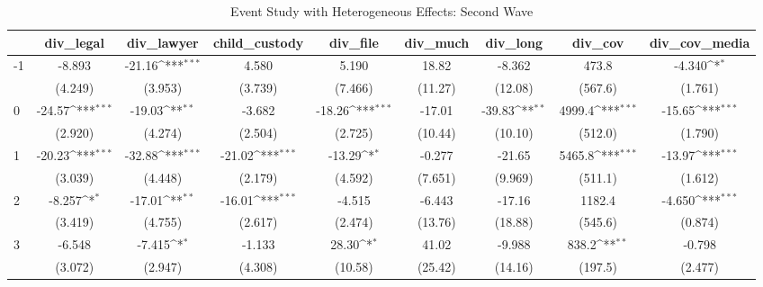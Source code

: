 \documentclass{article}
\begin{document}
{
\def\sym#1{\ifmmode^{#1}\else\(^{#1}\)\fi}
\begin{longtable}{l*{8}{c}}
\caption{Event Study with Heterogeneous Effects: Second Wave}\\
\hline\hline\endfirsthead\hline\endhead\hline\endfoot\endlastfoot
                &\multicolumn{1}{c}{div\_legal}&\multicolumn{1}{c}{div\_lawyer}&\multicolumn{1}{c}{child\_custody}&\multicolumn{1}{c}{div\_file}&\multicolumn{1}{c}{div\_much}&\multicolumn{1}{c}{div\_long}&\multicolumn{1}{c}{div\_cov}&\multicolumn{1}{c}{div\_cov\_media}\\
\hline
-1              &   -8.893         &   -21.16\sym{***}&    4.580         &    5.190         &    18.82         &   -8.362         &    473.8         &   -4.340\sym{*}  \\
                &  (4.249)         &  (3.953)         &  (3.739)         &  (7.466)         &  (11.27)         &  (12.08)         &  (567.6)         &  (1.761)         \\
0               &   -24.57\sym{***}&   -19.03\sym{**} &   -3.682         &   -18.26\sym{***}&   -17.01         &   -39.83\sym{**} &   4999.4\sym{***}&   -15.65\sym{***}\\
                &  (2.920)         &  (4.274)         &  (2.504)         &  (2.725)         &  (10.44)         &  (10.10)         &  (512.0)         &  (1.790)         \\
1               &   -20.23\sym{***}&   -32.88\sym{***}&   -21.02\sym{***}&   -13.29\sym{*}  &   -0.277         &   -21.65         &   5465.8\sym{***}&   -13.97\sym{***}\\
                &  (3.039)         &  (4.448)         &  (2.179)         &  (4.592)         &  (7.651)         &  (9.969)         &  (511.1)         &  (1.612)         \\
2               &   -8.257\sym{*}  &   -17.01\sym{**} &   -16.01\sym{***}&   -4.515         &   -6.443         &   -17.16         &   1182.4         &   -4.650\sym{***}\\
                &  (3.419)         &  (4.755)         &  (2.617)         &  (2.474)         &  (13.76)         &  (18.88)         &  (545.6)         &  (0.874)         \\
3               &   -6.548         &   -7.415\sym{*}  &   -1.133         &    28.30\sym{*}  &    41.02         &   -9.988         &    838.2\sym{**} &   -0.798         \\
                &  (3.072)         &  (2.947)         &  (4.308)         &  (10.58)         &  (25.42)         &  (14.16)         &  (197.5)         &  (2.477)         \\

\end{longtable}}
\end{document}
